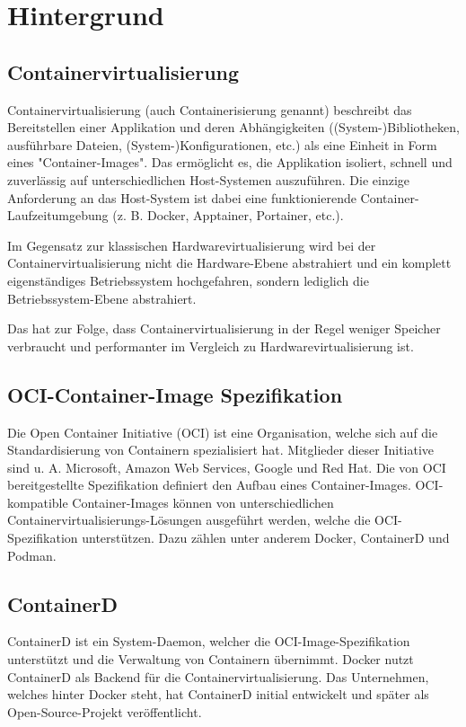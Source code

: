 \chapter{Hintergrund} \label{cha:background}

\section{Containervirtualisierung}

Containervirtualisierung (auch Containerisierung genannt) beschreibt das Bereitstellen einer Applikation und deren Abhängigkeiten ((System-)Bibliotheken, ausführbare Dateien, (System-)Konfigurationen, etc.) als eine Einheit in Form eines "Container-Images". Das ermöglicht es, die Applikation isoliert, schnell und zuverlässig auf unterschiedlichen Host-Systemen auszuführen. Die einzige Anforderung an das Host-System ist dabei eine funktionierende Container-Laufzeitumgebung (z. B. Docker, Apptainer, Portainer, etc.).

Im Gegensatz zur klassischen Hardwarevirtualisierung wird bei der Containervirtualisierung nicht die Hardware-Ebene abstrahiert und ein komplett eigenständiges Betriebssystem hochgefahren, sondern lediglich die Betriebssystem-Ebene abstrahiert.

Das hat zur Folge, dass Containervirtualisierung in der Regel weniger Speicher verbraucht und performanter im Vergleich zu Hardwarevirtualisierung ist.

\section{OCI-Container-Image Spezifikation}

Die Open Container Initiative (OCI) ist eine Organisation, welche sich auf die Standardisierung von Containern spezialisiert hat. Mitglieder dieser Initiative sind u. A. Microsoft, Amazon Web Services, Google und Red Hat. Die von OCI bereitgestellte Spezifikation definiert den Aufbau eines Container-Images. OCI-kompatible Container-Images können von unterschiedlichen Containervirtualisierungs-Lösungen ausgeführt werden, welche die OCI-Spezifikation unterstützen. Dazu zählen unter anderem Docker, ContainerD und Podman.

\section{ContainerD}

ContainerD ist ein System-Daemon, welcher die OCI-Image-Spezifikation unterstützt und die Verwaltung von Containern übernimmt. Docker nutzt ContainerD als Backend für die Containervirtualisierung. Das Unternehmen, welches hinter Docker steht, hat ContainerD initial entwickelt und später als Open-Source-Projekt veröffentlicht.

